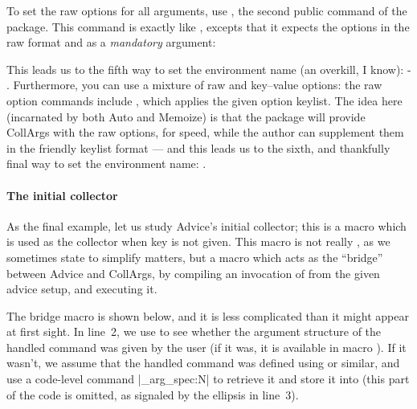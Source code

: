\documentclass[a4paper,11pt]{article}
\begin{document}
To set the raw options for all arguments, use , the
second public command of the package.  This command is exactly like
, excepts that it expects the options in the raw
format and as a \emph{mandatory} argument:

\begin{center}
  \textcolor{gray}{}
\end{center}

This leads us to the fifth way to set the environment name (an overkill, I
know): \hyp
{}.
Furthermore, you can use a mixture of raw and key--value options: the raw
option commands include , which applies the given option
keylist.  The idea here (incarnated by both Auto and Memoize) is that the
package will provide CollArgs with the raw options, for speed, while the
author can supplement them in the friendly keylist format --- and this leads
us to the sixth, and thankfully final way to set the environment name:
.


\paragraph{The initial collector}

As the final example, let us study Advice's initial collector; this is a macro
which is used as the collector when key  is not given.
This macro is not really , as we sometimes state to
simplify matters, but a macro which acts as the ``bridge'' between Advice and
CollArgs, by compiling an invocation of  from the
given advice setup, and executing it.

The bridge macro is shown below, and it is less complicated than it might
appear at first sight.  In line~2, we use  to see whether
the argument structure of the handled command was given by the user (if it was,
it is available in macro ).  If it wasn't, we assume that
the handled command was defined using  or similar, and
use a code-level  command |\cmd_arg_spec:N| to retrieve it and
store it into  (this part of the code is omitted, as
signaled by the ellipsis in line~3).
\end{document}
